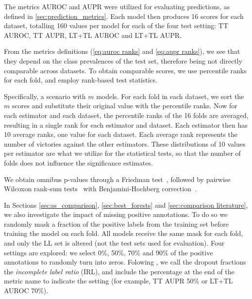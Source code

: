 The metrics AUROC and AUPR were utilized for evaluating predictions, as defined in \autoref{sec:prediction_metrics}. Each model then produces 16 scores for each dataset, totalling 160 values per model for each of the four test setting: TT AUROC, TT AUPR, LT+TL AUROC and LT+TL AUPR.
 
From the metrics definitions (\autoref{eq:auroc ranks} and \autoref{eq:aupr ranks}), we see that they depend on the class prevalences of the test set, therefore being not directly comparable across datasets.
To obtain comparable scores, we use percentile ranks for each fold, and employ rank-based test statistics.

Specifically, a scenario with $m$ models. For each fold in each dataset, we sort the $m$ scores and substitute their original value with the percentile ranks.
Now for each estimator and each dataset, the percentile ranks of the 16 folds are averaged, resulting in a single rank for each estimator and dataset. Each estimator then has 10 average ranks, one value for each dataset. Each average rank represents the number of victories against the other estimators. These distributions of 10 values per estimator are what we utilize for the statistical tests, so that the number of folds does not influence the significance estimates.

We obtain omnibus p-values through a Friedman test~\cite{demsar2006statistical,benavoli2016should}, followed by pairwise Wilcoxon rank-sum tests~\cite{benavoli2016should} with Benjamini-Hochberg correction~\cite{benjamini1995controlling,haynes2013benjamini}.

In Sections \ref{sec:ss_comparison}, \ref{sec:best_forests} and \ref{sec:comparison literature}, we also investigate the impact of missing positive annotations. To do so we randomly mask a fraction of the positive labels from the training set before training the model on each fold.
All models receive the same mask for each fold, and only the LL set is altered (not the test sets used for evaluation).
Four settings are explored: we select 0\%, 50\%, 70\% and 90\% of the positive annotations to randomly turn into zeros.
Folowing , we call the dropout fractions the \emph{incomplete label ratio} (IRL), and include the percentage at the end of the metric name to indicate the setting (for example, TT AUPR 50\% or LT+TL AUROC 70\%).



